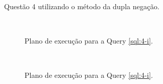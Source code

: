 \documentclass[a4paper,12pt]{article}
\begin{document}
\begin{program}
   
   \caption{Questão 4 utilizando o método da dupla negação.}
   \label{sql:4-i}
\end{program}

\begin{figure}[hpt]
   \begin{center}
      \\
   \end{center}
   \caption{Plano de execução para a Query \ref{sql:4-i}.}
   \label{fig:plano_4-i}
\end{figure}

\begin{figure}[hpt]
   \ContinuedFloat
   \begin{center}
      \\
   \end{center}
   \caption{Plano de execução para a Query \ref{sql:4-i}.}
\end{figure}
\end{document}
